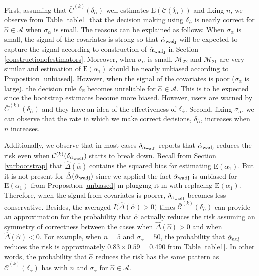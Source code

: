 \documentclass[11pt,3p,review,authoryear]{elsarticle}
\def\mc#1{\mathcal{#1}} %
\def\E#1{\mathrm{E}(#1)} %
\theoremstyle{definition}
\begin{document}
First, assuming that $\bar{C}^{(k)}(\delta_{\hat{\alpha}})$ well estimates $\E{\mc{C}(\delta_{\hat{\alpha}}})$ and fixing $n$, we  observe from Table \ref{table1} that the decision making using $\delta_{\hat{\alpha}}$ is nearly correct for $\hat{\alpha}\in \mc{A}$ when $\sigma_{\alpha}$ is small. The reasons can be explained as follows: When $\sigma_{\alpha}$ is small, the signal of the covariates is strong so that $\hat{\alpha}_{\rm wadj}$ will be expected to capture the signal according to construction of $\hat{\alpha}_{\rm wadj}$ in Section \ref{constructionofestimators}. Moreover, when $\sigma_{\alpha}$ is small, $\mc{M}_{22}$ and $\mc{M}_{21}$ are very similar and estimation of $\E{\alpha_1}$ should be nearly unbiased according to Proposition \ref{unbiased}. However, when the signal of the covariates is poor ($\sigma_{\alpha}$ is large), the decision rule $\delta_{\hat{\alpha}}$  becomes unreliable for $\hat{\alpha}\in \mc{A}$. This is to be expected since the bootstrap estimates become more biased. However, users are warned by $\bar{C}^{(k)}(\delta_{\hat{\alpha}})$ and they have an idea of the effectiveness of $\delta_{\hat{\alpha}}$. Second, fixing $\sigma_{\alpha}$, we can observe that the rate in which we make correct decisions, $\delta_{\hat{\alpha}}$, increases when $n$ increases. 

Additionally, we  observe that in most cases $\delta_{\hat{\alpha}_{\rm wadj}}$ reports that $\hat{\alpha}_{\rm wadj}$ reduces the risk even when $\bar{\mc{C}}^{(k)}(\delta_{\hat{\alpha}_{\rm wadj}})$ starts to break down. Recall from Section \ref{varbootstrap} that $\hat{\Delta}(\hat{\alpha})$ contains the squared bias for estimating $\E{\alpha_1}$. But it is not present for $\hat{\Delta}(\hat{\alpha}_{\rm wadj})$ since we applied the fact  $\hat{\alpha}_{\rm wadj}$ is unbiased for $\E{\alpha_1}$ from Proposition \ref{unbiased} in plugging it in with replacing $\E{\alpha_1}$. Therefore, when the signal from covariates is poorer, $\delta_{\hat{\alpha}_{\rm wadj}}$ becomes less conservative. Besides, the averaged $I\big(\hat{\Delta}(\hat{\alpha})>0\big)$ times $\bar{\mc{C}}^{(k)}(\delta_{\hat{\alpha}})$ can provide an approximation for the probability that $\hat{\alpha}$ actually reduces the risk assuming an symmetry of correctness between the cases when $\hat{\Delta}(\hat{\alpha})>0$ and when $\hat{\Delta}(\hat{\alpha})<0$. For example, when $n = 5$ and $\sigma_{\alpha}=50$, the probability that $\hat{\alpha}_{\rm adj}$ reduces the risk is approximately $0.83 \times 0.59 = 0.490$ from Table \ref{table1}.  In other words,  the probability that $\hat{\alpha}$ reduces the risk has the same pattern as $\bar{\mc{C}}^{(k)}(\delta_{\hat{\alpha}})$ has with $n$ and $\sigma_{\alpha}$ for $\hat{\alpha}\in \mc{A}$.
\end{document}
